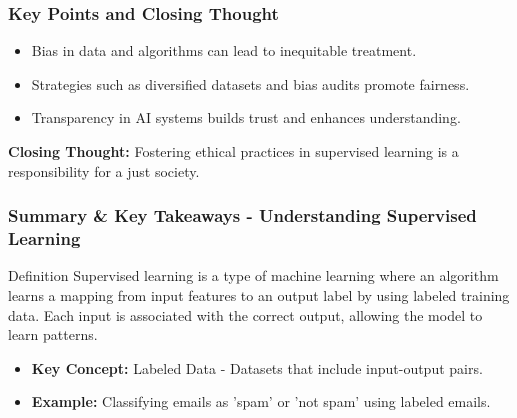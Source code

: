 \documentclass[aspectratio=169]{beamer}
\begin{document}
\begin{frame}[fragile]
    \frametitle{Key Points and Closing Thought}
    \begin{itemize}
        \item Bias in data and algorithms can lead to inequitable treatment.
        \item Strategies such as diversified datasets and bias audits promote fairness.
        \item Transparency in AI systems builds trust and enhances understanding.
    \end{itemize}

    \textbf{Closing Thought:} Fostering ethical practices in supervised learning is a responsibility for a just society.
\end{frame}

\begin{frame}[fragile]
    \frametitle{Summary \& Key Takeaways - Understanding Supervised Learning}
    \begin{block}{Definition}
        Supervised learning is a type of machine learning where an algorithm learns a mapping from input features to an output label by using labeled training data. Each input is associated with the correct output, allowing the model to learn patterns.
    \end{block}
    \begin{itemize}
        \item \textbf{Key Concept:} Labeled Data - Datasets that include input-output pairs.
        \item \textbf{Example:} Classifying emails as 'spam' or 'not spam' using labeled emails.
    \end{itemize}
\end{frame}
\end{document}
